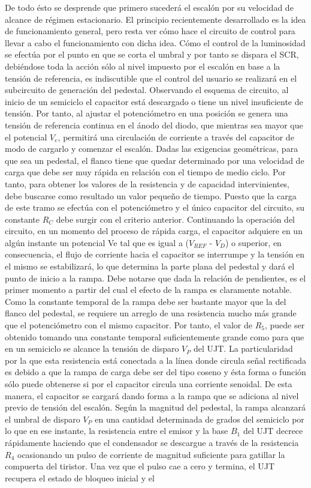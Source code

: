 \documentclass{article}
\begin{document}
De todo ésto se desprende que primero sucederá el escalón por su velocidad de alcance de régimen estacionario. El principio recientemente desarrollado es la idea de funcionamiento general, pero resta ver cómo hace el circuito de control para llevar a cabo el funcionamiento con dicha idea.  Cómo el control de la luminosidad se efectúa por el punto en que se corta el umbral y por tanto se dispara el SCR, debiéndose toda la acción sólo al nivel impuesto por el escalón en base a la tensión de referencia, es indiscutible que el control del usuario se realizará en el subcircuito de generación del pedestal. Observando el esquema de circuito, al inicio de un semiciclo el capacitor está descargado o               tiene un nivel insuficiente de tensión. Por tanto, al ajustar el potenciómetro en una posición se genera una tensión de referencia continua en el ánodo del diodo, que mientras sea mayor que el potencial $V_e$, permitirá una circulación de corriente a través del capacitor de modo de cargarlo y comenzar el escalón. Dadas las exigencias geométricas, para que sea un pedestal, el flanco tiene que quedar determinado por una velocidad de carga que debe ser muy rápida en relación con el tiempo de medio ciclo. Por tanto, para obtener los valores de la resistencia y de capacidad intervinientes, debe buscarse como resultado un valor pequeño de tiempo. Puesto que la carga de este tramo se efectúa con el potenciómetro y el único capacitor del circuito, su constante $R_C$ debe surgir con el criterio anterior.  Continuando la operación del circuito, en un momento del proceso de rápida carga, el capacitor adquiere en un algún instante un potencial Ve tal que es igual a ($V_{REF}$ - $V_D$) o superior, en consecuencia, el flujo de corriente hacia el capacitor se interrumpe y la tensión en el mismo se estabilizará, lo que determina la parte plana del pedestal y dará el punto de inicio a la rampa. Debe notarse que dada la relación de pendientes, es el primer momento a partir del cual el efecto de la rampa es claramente notable. Como la constante temporal de la rampa debe ser bastante mayor que la del flanco del pedestal, se requiere un arreglo de una resistencia mucho más grande que el potenciómetro con el mismo capacitor. Por tanto, el valor de $R_5$, puede ser                 obtenido tomando una constante temporal suficientemente grande como para que en un semiciclo se alcance la tensión de disparo $V_P$ del UJT. La particularidad por la que esta                resistencia está conectada a la línea donde circula señal rectificada es debido a que la rampa de carga debe ser del tipo coseno y ésta forma o función sólo puede obtenerse si por el capacitor circula una corriente senoidal. De esta manera, el capacitor se cargará dando forma a la rampa que se adiciona al nivel previo de tensión del escalón. Según la magnitud del pedestal, la rampa alcanzará el umbral de disparo $V_P$ en una cantidad determinada de grados del semiciclo por lo que en ese instante, la resistencia entre el emisor y la base $B_1$ del UJT decrece rápidamente haciendo que el condensador se descargue a través de la resistencia $R_4$ ocasionando un pulso de corriente de magnitud suficiente para gatillar la compuerta del tiristor. Una vez que el pulso cae a cero y termina, el UJT recupera el estado de bloqueo inicial y el 
\end{document}

